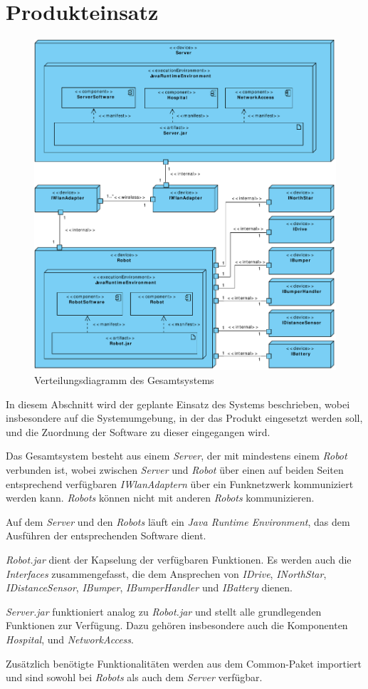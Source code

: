 \section{Produkteinsatz}

\begin{figure}[H]
\centering
\includegraphics[width=1\textwidth]{img/1-Entwurf-9-Produkteinsatz}
\caption{Verteilungsdiagramm des Gesamtsystems}
\label{ProdukteinsatzKomp}
\end{figure}

In diesem Abschnitt wird der geplante Einsatz des Systems beschrieben, wobei insbesondere auf die Systemumgebung, in der das Produkt eingesetzt werden soll, und die Zuordnung der Software zu dieser eingegangen wird.

Das Gesamtsystem besteht aus einem \emph{Server}, der mit mindestens einem \emph{Robot} verbunden ist, wobei zwischen \emph{Server} und \emph{Robot} über einen auf beiden Seiten entsprechend verfügbaren \emph{IWlanAdaptern} über ein Funknetzwerk kommuniziert werden kann. \emph{Robots} können nicht mit anderen \emph{Robots} kommunizieren.

Auf dem \emph{Server} und den \emph{Robots} läuft ein \emph{Java Runtime Environment}, das dem Ausführen der entsprechenden Software dient.

\emph{Robot.jar} dient der Kapselung der verfügbaren Funktionen. Es werden auch die \emph{Interfaces} zusammengefasst, die dem Ansprechen von \emph{IDrive}, \emph{INorthStar}, \emph{IDistanceSensor}, \emph{IBumper}, \emph{IBumperHandler} und \emph{IBattery} dienen.

\emph{Server.jar} funktioniert analog zu \emph{Robot.jar} und stellt alle grundlegenden Funktionen zur Verfügung. Dazu gehören insbesondere auch die Komponenten \emph{Hospital}, und \emph{NetworkAccess}.

Zusätzlich benötigte Funktionalitäten werden aus dem Common-Paket importiert und sind sowohl bei \emph{Robots} als auch dem \emph{Server} verfügbar.
